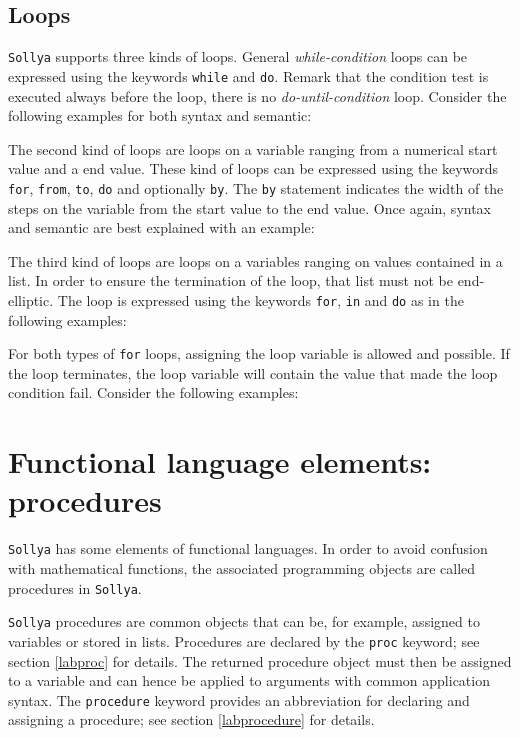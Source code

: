 \documentclass[a4paper]{article}
\newcommand{\key}[1]{\texttt{#1}}
\newcommand{\sollya}{\texttt{Sollya}\xspace}
\begin{document}


\subsection{Loops}

\sollya supports three kinds of loops. General \emph{while-condition}
loops can be expressed using the keywords \key{while} and
\key{do}. Remark that the condition test is executed always before the
loop, there is no \emph{do-until-condition} loop. Consider the following 
examples for both syntax and semantic:



The second kind of loops are loops on a variable ranging from a
numerical start value and a end value. These kind of loops can be
expressed using the keywords \key{for}, \key{from}, \key{to}, \key{do}
and optionally \key{by}. The \key{by} statement indicates the width of
the steps on the variable from the start value to the end value. Once
again, syntax and semantic are best explained with an example:



The third kind of loops are loops on a variables ranging on values
contained in a list. In order to ensure the termination of the loop,
that list must not be end-elliptic. The loop is expressed using the
keywords \key{for}, \key{in} and \key{do} as in the following
examples:



For both types of \key{for} loops, assigning the loop variable is
allowed and possible. If the loop terminates, the loop variable will
contain the value that made the loop condition fail. Consider the
following examples:



\section{Functional language elements: procedures}

\sollya has some elements of functional languages. In order to 
avoid confusion with mathematical functions, the associated 
programming objects are called procedures in \sollya. 

\sollya procedures are common objects that can be, for example,
assigned to variables or stored in lists. Procedures are declared by
the \key{proc} keyword; see section \ref{labproc} for details. The
returned procedure object must then be assigned to a variable and can
hence be applied to arguments with common application syntax. The
\key{procedure} keyword provides an abbreviation for declaring and
assigning a procedure; see section \ref{labprocedure} for details.
\end{document}
